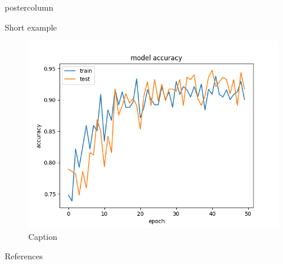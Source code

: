 \documentclass{beamer}
\begin{document}
\begin{frame}
\begin{columns}
\begin{column}{.57\textwidth}
\begin{beamercolorbox}[center]{postercolumn}
\begin{minipage}{.98\textwidth}
{\begin{myblock}{Short example}
					    \begin{figure}
					        \centering
					        \includegraphics[scale=1.5]{img/accuracy_train.png}
					        \caption{Caption}
					        \label{fig:my_label}
					    \end{figure}
					    
					\end{myblock}
					\begin{myblock}{References}
						\footnotesize
						
						
					\end{myblock}\vfill
		}\end{minipage}\end{beamercolorbox}
	\end{column}
\end{columns}
\end{frame}
\end{document}
